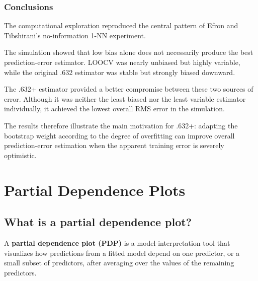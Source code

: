 \documentclass[
  letterpaper,
  DIV=11,
  numbers=noendperiod]{scrreprt}
\begin{document}
\subsection{Conclusions}\label{conclusions-1}

The computational exploration reproduced the central pattern of Efron
and Tibshirani's no-information 1-NN experiment.

The simulation showed that low bias alone does not necessarily produce
the best prediction-error estimator. LOOCV was nearly unbiased but
highly variable, while the original .632 estimator was stable but
strongly biased downward.

The .632+ estimator provided a better compromise between these two
sources of error. Although it was neither the least biased nor the least
variable estimator individually, it achieved the lowest overall RMS
error in the simulation.

The results therefore illustrate the main motivation for .632+: adapting
the bootstrap weight according to the degree of overfitting can improve
overall prediction-error estimation when the apparent training error is
severely optimistic.


\chapter{Partial Dependence Plots}\label{partial-dependence-plots}

\section{What is a partial dependence
plot?}\label{what-is-a-partial-dependence-plot}

\begin{tcolorbox}[enhanced jigsaw, arc=.35mm, bottomrule=.15mm, bottomtitle=1mm, breakable, colback=white, colbacktitle=quarto-callout-note-color!10!white, colframe=quarto-callout-note-color-frame, coltitle=black, left=2mm, leftrule=.75mm, opacityback=0, opacitybacktitle=0.6, rightrule=.15mm, title=\textcolor{quarto-callout-note-color}{\faInfo}\hspace{0.5em}{Definition}, titlerule=0mm, toprule=.15mm, toptitle=1mm]

A \textbf{partial dependence plot (PDP)} is a model-interpretation tool
that visualizes how predictions from a fitted model depend on one
predictor, or a small subset of predictors, after averaging over the
values of the remaining predictors.

\end{tcolorbox}
\end{document}
